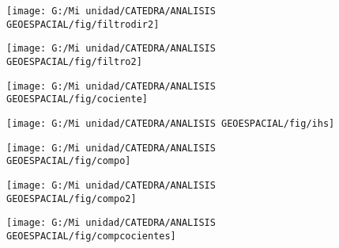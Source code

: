 \documentclass[14pt]{beamer}
\begin{document}
\begin{frame}
  \begin{figure}
    \centering
    \texttt{[image: G:/Mi unidad/CATEDRA/ANALISIS GEOESPACIAL/fig/filtrodir2]}
  \end{figure}
\tiny{}
\end{frame}
\begin{frame}
  \begin{figure}
    \centering
    \texttt{[image: G:/Mi unidad/CATEDRA/ANALISIS GEOESPACIAL/fig/filtro2]}
  \end{figure}
\tiny{}
\end{frame}
\begin{frame}
  \begin{figure}
    \centering
    \texttt{[image: G:/Mi unidad/CATEDRA/ANALISIS GEOESPACIAL/fig/cociente]}
  \end{figure}
\tiny{}
\end{frame}
\begin{frame}
  \begin{figure}
    \centering
    \texttt{[image: G:/Mi unidad/CATEDRA/ANALISIS GEOESPACIAL/fig/ihs]}
  \end{figure}
\tiny{}
\end{frame}
\begin{frame}
  \begin{figure}
    \centering
    \texttt{[image: G:/Mi unidad/CATEDRA/ANALISIS GEOESPACIAL/fig/compo]}
  \end{figure}
\tiny{}
\end{frame}
\begin{frame}
  \begin{figure}
    \centering
    \texttt{[image: G:/Mi unidad/CATEDRA/ANALISIS GEOESPACIAL/fig/compo2]}
  \end{figure}
\tiny{}
\end{frame}
\begin{frame}
  \begin{figure}
    \centering
    \texttt{[image: G:/Mi unidad/CATEDRA/ANALISIS GEOESPACIAL/fig/compcocientes]}
  \end{figure}
\tiny{}
\end{frame}
\end{document}

